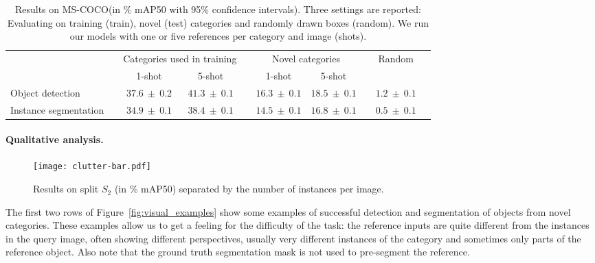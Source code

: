 \documentclass{article}
\newcommand{\coco}{MS-COCO\xspace}
\newcommand{\plusminus}[1]{{\scriptstyle ~\pm~ #1}}
\begin{document}
\begin{table}[t]
\begin{center}
\begin{small}
\begin{tabular}{lccccccccc}
& \hspace{5pt} & \multicolumn{2}{c}{Categories used in training} & \hspace{5pt} & \multicolumn{2}{c}{Novel categories} & \hspace{5pt} & Random \\
& & 1-shot & 5-shot & & 1-shot & 5-shot & &\\
\hline\hline
Object detection & & $37.6 \plusminus{0.2}$ & $41.3 \plusminus{0.1}$ & & $16.3 \plusminus{0.1}$ & $18.5 \plusminus{0.1}$ & & $1.2 \plusminus{0.1}$ \\
Instance segmentation & & $34.9 \plusminus{0.1}$ & $38.4 \plusminus{0.1}$ & & $14.5 \plusminus{0.1}$ & $16.8 \plusminus{0.1}$ & & $0.5 \plusminus{0.1}$
\end{tabular}
\end{small}
\end{center}
\caption{Results on \coco (in \% mAP50 with 95\% confidence intervals). Three settings are reported: Evaluating on training (train), novel (test) categories and randomly drawn boxes (random). We run our models with one or five references per category and image (shots).}
\label{table:results_one_shot}
\end{table}

\paragraph{Qualitative analysis.}

\begin{wrapfigure}[15]{r}{0.25\textwidth}
    \centering
    \texttt{[image: clutter-bar.pdf]}
    \vspace{-0.5cm}
    \caption{Results on split $S_2$ (in \% mAP50) separated by the number of instances per image.}
    \label{fig:clutter-results}
\end{wrapfigure}

The first two rows of Figure~\ref{fig:visual_examples} show some examples of successful detection and segmentation of objects from novel categories. These examples allow us to get a feeling for the difficulty of the task: the reference inputs are quite different from the instances in the query image, often showing different perspectives, usually very different instances of the category and sometimes only parts of the reference object. Also note that the ground truth segmentation mask is not used to pre-segment the reference.
\end{document}
